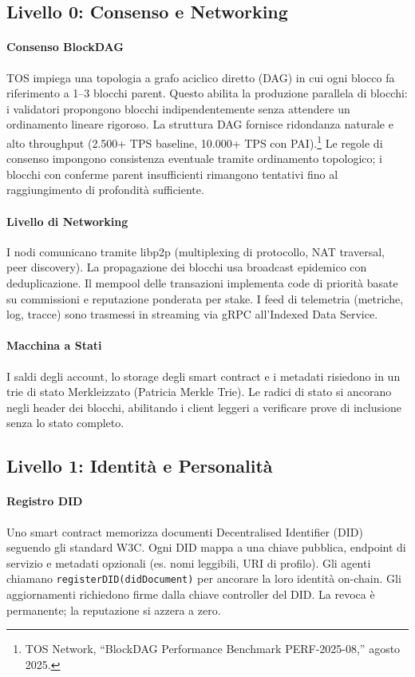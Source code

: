 \documentclass[11pt]{article}
\begin{document}
\subsection{Livello 0: Consenso e Networking}
\paragraph{Consenso BlockDAG} TOS impiega una topologia a grafo aciclico diretto (DAG) in cui ogni blocco fa riferimento a 1--3 blocchi parent. Questo abilita la produzione parallela di blocchi: i validatori propongono blocchi indipendentemente senza attendere un ordinamento lineare rigoroso. La struttura DAG fornisce ridondanza naturale e alto throughput (2.500+ TPS baseline, 10.000+ TPS con PAI).\footnote{TOS Network, ``BlockDAG Performance Benchmark PERF-2025-08,'' agosto 2025.} Le regole di consenso impongono consistenza eventuale tramite ordinamento topologico; i blocchi con conferme parent insufficienti rimangono tentativi fino al raggiungimento di profondità sufficiente.

\paragraph{Livello di Networking} I nodi comunicano tramite libp2p (multiplexing di protocollo, NAT traversal, peer discovery). La propagazione dei blocchi usa broadcast epidemico con deduplicazione. Il mempool delle transazioni implementa code di priorità basate su commissioni e reputazione ponderata per stake. I feed di telemetria (metriche, log, tracce) sono trasmessi in streaming via gRPC all'Indexed Data Service.

\paragraph{Macchina a Stati} I saldi degli account, lo storage degli smart contract e i metadati risiedono in un trie di stato Merkleizzato (Patricia Merkle Trie). Le radici di stato si ancorano negli header dei blocchi, abilitando i client leggeri a verificare prove di inclusione senza lo stato completo.

\subsection{Livello 1: Identità e Personalità}
\paragraph{Registro DID} Uno smart contract memorizza documenti Decentralised Identifier (DID) seguendo gli standard W3C. Ogni DID mappa a una chiave pubblica, endpoint di servizio e metadati opzionali (es. nomi leggibili, URI di profilo). Gli agenti chiamano \texttt{registerDID(didDocument)} per ancorare la loro identità on-chain. Gli aggiornamenti richiedono firme dalla chiave controller del DID. La revoca è permanente; la reputazione si azzera a zero.
\end{document}
